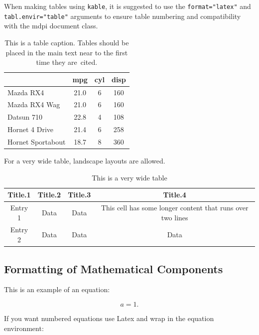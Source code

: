 \documentclass[notspecified,article,submit,moreauthors,pdftex]{Definitions/mdpi}
\begin{document}
When making tables using \texttt{kable}, it is suggested to use the
\texttt{format="latex"} and \texttt{tabl.envir="table"} arguments to
ensure table numbering and compatibility with the mdpi document class.

\begin{table}[H]

\caption{\label{tab:tab1}This is a table caption. Tables should be placed in the 
             main text near to the first time they are~cited.}
\begin{tabular}[t]{lccc}
\toprule
  & mpg & cyl & disp\\
\midrule
Mazda RX4 & 21.0 & 6 & 160\\
Mazda RX4 Wag & 21.0 & 6 & 160\\
Datsun 710 & 22.8 & 4 & 108\\
Hornet 4 Drive & 21.4 & 6 & 258\\
Hornet Sportabout & 18.7 & 8 & 360\\
\bottomrule
\end{tabular}
\end{table}

For a very wide table, landscape layouts are allowed.

\startlandscape

\begin{table}[H]

\caption{\label{tab:tab2}This is a very wide table}
\begin{tabular}[t]{cccc}
\toprule
Title.1 & Title.2 & Title.3 & Title.4\\
\midrule
Entry 1 & Data & Data & This cell has some longer content that runs over
                               two lines\\
Entry 2 & Data & Data & Data\\
\bottomrule
\end{tabular}
\end{table}

\finishlandscape

\subsection{Formatting of Mathematical
Components}\label{formatting-of-mathematical-components}

This is an example of an equation:

\[
a = 1.
\]

If you want numbered equations use Latex and wrap in the equation
environment:
\end{document}
